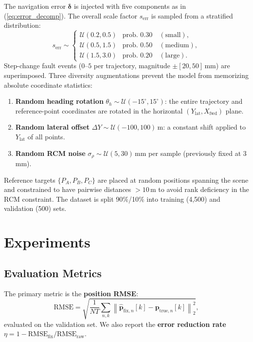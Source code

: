 \documentclass[conference]{IEEEtran}
\newcommand{\vp}{\mathbf{p}}
\newcommand{\vdelta}{\bm{\delta}}
\newcommand{\norm}[1]{\left\lVert#1\right\rVert}
\begin{document}
The navigation error $\vdelta$ is injected with five components as in
(\ref{eq:error_decomp}).
The overall scale factor $s_\text{err}$ is sampled from a stratified
distribution:
\begin{equation}
  s_\text{err} \sim
  \begin{cases}
    \mathcal{U}(0.2, 0.5) & \text{prob.\ } 0.30 \quad (\text{small}), \\
    \mathcal{U}(0.5, 1.5) & \text{prob.\ } 0.50 \quad (\text{medium}), \\
    \mathcal{U}(1.5, 3.0) & \text{prob.\ } 0.20 \quad (\text{large}).
  \end{cases}
\end{equation}
Step-change fault events ($0$–$5$ per trajectory, magnitude $\pm[20,50]$\,mm)
are superimposed.
Three diversity augmentations prevent the model from memorizing
absolute coordinate statistics:
\begin{enumerate}
  \item \textbf{Random heading rotation} $\theta_h \sim \mathcal{U}(-15^\circ, 15^\circ)$:
        the entire trajectory and reference-point coordinates are rotated in the
        horizontal $(Y_\text{lat}, X_\text{fwd})$ plane.
  \item \textbf{Random lateral offset} $\Delta Y \sim \mathcal{U}(-100, 100)$\,m:
        a constant shift applied to $Y_\text{lat}$ of all points.
  \item \textbf{Random RCM noise} $\sigma_\rho \sim \mathcal{U}(5, 30)$\,mm per sample
        (previously fixed at $3$\,mm).
\end{enumerate}
Reference targets $\{P_A, P_B, P_C\}$ are placed at random positions
spanning the scene and constrained to have pairwise distances $>10$\,m
to avoid rank deficiency in the RCM constraint.
The dataset is split 90\%/10\% into training (4{,}500) and validation (500) sets.

\section{Experiments}
\label{sec:experiments}

\subsection{Evaluation Metrics}

The primary metric is the \textbf{position RMSE}:
\begin{equation}
  \text{RMSE} = \sqrt{\frac{1}{NT}\sum_{n,k}
    \norm{\hat{\vp}_{\text{fix},n}[k] - \vp_{\text{true},n}[k]}_2^2},
  \label{eq:rmse}
\end{equation}
evaluated on the validation set.
We also report the \textbf{error reduction rate}
$\eta = 1 - \text{RMSE}_\text{fix}/\text{RMSE}_\text{raw}$.
\end{document}
